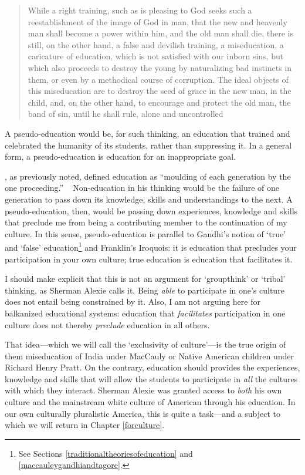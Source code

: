 \begin{quote}

While a right training, such as is pleasing to God seeks such a reestablishment of the image of God in man, that the new and heavenly man shall become a power within him, and the old man shall die, there is still, on the other hand, a false and devilish training, a miseducation, a caricature of education, which is not satisfied with our inborn sins, but which also proceeds to destroy the young by naturalizing bad instincts in them, or even by a methodical course of corruption. The ideal objects of this miseducation are to destroy the seed of grace in the new man, in the child, and, on the other hand, to encourage and protect the old man, the band of sin, until he shall rule, alone and uncontrolled ~\citep[p. 220]{Barnard:1860ty}
\end{quote}

A pseudo-education would be, for such thinking, an education that trained and celebrated the humanity of its students, rather than suppressing it. In a general form, a pseudo-education is education for an inappropriate goal.

, as previously noted, defined education as ``moulding of each generation by the one proceeding.'' ~\citep[p. 5]{Bain:1892ta} Non-education in his thinking would be the failure of one generation to pass down its knowledge, skills and understandings to the next. A pseudo-education, then, would be passing down experiences, knowledge and skills that preclude me from being a contributing member to the continuation of my culture. In this sense, pseudo-education is parallel to Gandhi's notion of `true' and `false' education\footnote{See Sections \ref{traditionaltheoriesofeducation} and \ref{maccauleygandhiandtagore}.} and Franklin's Iroquois: it is education that precludes your participation in your own culture; true education is education that facilitates it.

I should make explicit that this is not an argument for `groupthink' or `tribal' thinking, as Sherman Alexie calls it. Being \emph{able} to participate in one's culture does not entail being constrained by it. Also, I am not arguing here for balkanized educational systems: education that \emph{facilitates} participation in one culture does not thereby \emph{preclude} education in all others. 

That idea---which we will call the `exclusivity of culture'---is the true origin of them miseducation of India under MacCauly or Native American children under Richard Henry Pratt. On the contrary, education should provides the experiences, knowledge and skills that will allow the students to participate in \emph{all} the cultures with which they interact. Sherman Alexie was granted access to \emph{both} his own culture and the mainstream white culture of American through his education. In our own culturally pluralistic America, this is quite a task---and a subject to which we will return in Chapter \ref{forculture}.


